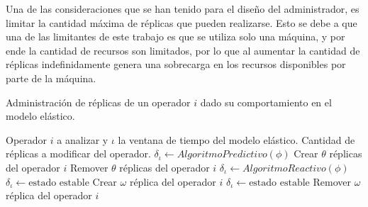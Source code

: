 Una de las consideraciones que se han tenido para el dise\~no del administrador, es limitar la cantidad m\'axima de r\'eplicas que pueden realizarse. Esto se debe a que una de las limitantes de este trabajo es que se utiliza solo una m\'aquina, y por ende la cantidad de recursos son limitados, por lo que al aumentar la cantidad de r\'eplicas indefinidamente genera una sobrecarga en los recursos disponibles por parte de la m\'aquina.

\newpage
\begin{algorithm}[!ht]
	\caption{Administraci\'on de r\'eplicas de un operador $i$ dado su comportamiento en el modelo el\'astico.}
	\label{alg:administracion}
	\begin{algorithmic}[1]
	\REQUIRE Operador $i$ a analizar y $\iota$ la ventana de tiempo del modelo el\'astico.
	\ENSURE Cantidad de r\'eplicas a modificar del operador.	
		\STATE $\delta_{\iota} \leftarrow AlgoritmoPredictivo(\phi)$
				\RETURN Crear $\theta$ r\'eplicas del operador $i$
			\ENDIF
			\RETURN Remover $\theta$ r\'eplicas del operador $i$
		\ENDIF
	\ELSE[$\iota$ es $T_r$]
		\STATE $\delta_{\iota} \leftarrow AlgoritmoReactivo(\phi)$
				\STATE $\delta_{\iota} \leftarrow \text{estado estable}$ 
				\RETURN Crear $\omega$ r\'eplica del operador $i$
			\ENDIF
			\STATE $\delta_{\iota} \leftarrow \text{estado estable}$ 
			\RETURN Remover $\omega$ r\'eplica del operador $i$
		\ENDIF 
	\ENDIF	
	\end{algorithmic}
\end{algorithm}
